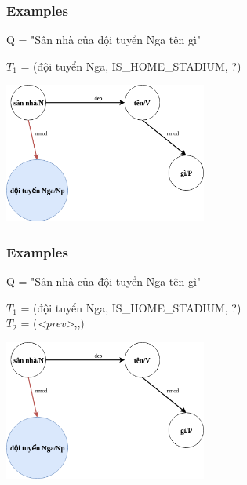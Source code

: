 \documentclass{beamer}
\begin{document}
\begin{frame}
	\frametitle{Examples}
	
	Q = "Sân nhà của đội tuyển Nga tên gì"
	
	$T_1$ = (đội tuyển Nga, IS\_HOME\_STADIUM, ?)
	
	\begin{center} 
		\centering 
			\includegraphics[width=0.5\textwidth,height=0.5\textheight,keepaspectratio]{secondextree2}
			\vspace{0.5cm} 
	\end{center}
		
\end{frame}

\begin{frame}
	\frametitle{Examples}
	
	Q = "Sân nhà của đội tuyển Nga tên gì"
	
	$T_1$ = (đội tuyển Nga, IS\_HOME\_STADIUM, ?)\\
	$T_2$ = (\textit{<prev>},,)
	
	\begin{center} 
		\centering 
			\includegraphics[width=0.5\textwidth,height=0.5\textheight,keepaspectratio]{secondextree2}
			\vspace{0.5cm} 
	\end{center}
		
\end{frame}
\end{document}
